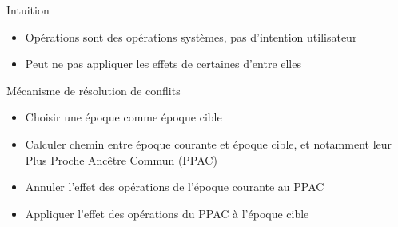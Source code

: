 \begin{frame}{Intuition}
  \begin{itemize}
    \item Opérations \ren sont des opérations systèmes, \ie pas d'intention utilisateur
    \item Peut ne pas appliquer les effets de certaines d'entre elles
  \end{itemize}
  \begin{block}{Mécanisme de résolution de conflits}
    \begin{itemize}
      \item Choisir une époque comme époque cible
      \item Calculer chemin entre époque courante et époque cible, et notamment leur Plus Proche Ancêtre Commun (PPAC)
      \item Annuler l'effet des opérations \ren de l'époque courante au PPAC
      \item Appliquer l'effet des opérations \ren du PPAC à l'époque cible
    \end{itemize}
  \end{block}
\end{frame}

